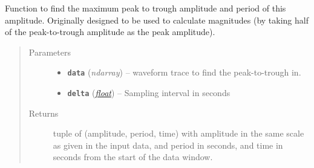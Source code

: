 \documentclass[a4paper,10pt,english]{sphinxmanual}
\begin{document}
\begin{fulllineitems}
\label{utils:mag_calc._max_p2t}
Function to find the maximum peak to trough amplitude and period of this
amplitude.  Originally designed to be used to calculate magnitudes (by
taking half of the peak-to-trough amplitude as the peak amplitude).
\begin{quote}\begin{description}
\item[{Parameters}] \leavevmode\begin{itemize}
\item {} 
\textbf{\texttt{data}} (\emph{ndarray}) -- waveform trace to find the peak-to-trough in.

\item {} 
\textbf{\texttt{delta}} (\href{https://docs.python.org/library/functions.html\#float}{\emph{float}}) -- Sampling interval in seconds

\end{itemize}

\item[{Returns}] \leavevmode
tuple of (amplitude, period, time) with amplitude in the same scale as
given in the input data, and period in seconds, and time in seconds
from the start of the data window.

\end{description}\end{quote}

\end{fulllineitems}

\end{document}
